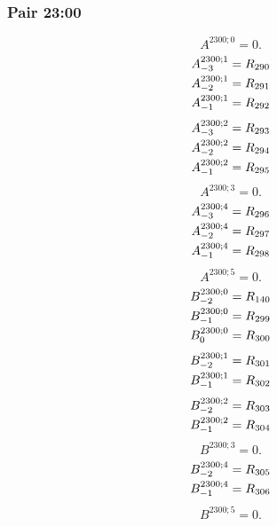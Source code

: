 \documentclass[11pt,a4paper]{article}
\begin{document}
\subsubsection{Pair 23:00}
\begin{equation}
A^{2300;0}=0.
\label{eq:cat-map-378}
\end{equation}
\begin{equation}
\shortstack[l]{$\displaystyle A^{2300;1}_{-3}=R_{290}$\\
$\displaystyle A^{2300;1}_{-2}=R_{291}$\\
$\displaystyle A^{2300;1}_{-1}=R_{292}$}
\label{eq:cat-map-379}
\end{equation}
\begin{equation}
\shortstack[l]{$\displaystyle A^{2300;2}_{-3}=R_{293}$\\
$\displaystyle A^{2300;2}_{-2}=R_{294}$\\
$\displaystyle A^{2300;2}_{-1}=R_{295}$}
\label{eq:cat-map-380}
\end{equation}
\begin{equation}
A^{2300;3}=0.
\label{eq:cat-map-381}
\end{equation}
\begin{equation}
\shortstack[l]{$\displaystyle A^{2300;4}_{-3}=R_{296}$\\
$\displaystyle A^{2300;4}_{-2}=R_{297}$\\
$\displaystyle A^{2300;4}_{-1}=R_{298}$}
\label{eq:cat-map-382}
\end{equation}
\begin{equation}
A^{2300;5}=0.
\label{eq:cat-map-383}
\end{equation}
\begin{equation}
\shortstack[l]{$\displaystyle B^{2300;0}_{-2}=R_{140}$\\
$\displaystyle B^{2300;0}_{-1}=R_{299}$\\
$\displaystyle B^{2300;0}_{0}=R_{300}$}
\label{eq:cat-map-384}
\end{equation}
\begin{equation}
\shortstack[l]{$\displaystyle B^{2300;1}_{-2}=R_{301}$\\
$\displaystyle B^{2300;1}_{-1}=R_{302}$}
\label{eq:cat-map-385}
\end{equation}
\begin{equation}
\shortstack[l]{$\displaystyle B^{2300;2}_{-2}=R_{303}$\\
$\displaystyle B^{2300;2}_{-1}=R_{304}$}
\label{eq:cat-map-386}
\end{equation}
\begin{equation}
B^{2300;3}=0.
\label{eq:cat-map-387}
\end{equation}
\begin{equation}
\shortstack[l]{$\displaystyle B^{2300;4}_{-2}=R_{305}$\\
$\displaystyle B^{2300;4}_{-1}=R_{306}$}
\label{eq:cat-map-388}
\end{equation}
\begin{equation}
B^{2300;5}=0.
\label{eq:cat-map-389}
\end{equation}
\end{document}
